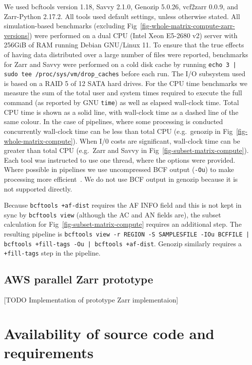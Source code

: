 \documentclass[a4paper,num-refs]{oup-contemporary}
\begin{document}
We used bcftools version 1.18, Savvy 2.1.0, Genozip 5.0.26,
vcf2zarr 0.0.9, and Zarr-Python 2.17.2. 
All tools used default settings, 
unless otherwise stated.
All simulation-based benchmarks (excluding Fig~\ref{fig-whole-matrix-compute-zarr-versions}) were performed on a 
dual CPU (Intel Xeon E5-2680 v2)
server with 256GiB of RAM running Debian GNU/Linux 11.
To ensure that the true effects of having data distributed over a large 
number of files were reported, benchmarks for Zarr and Savvy were 
performed on a cold disk cache by running 
\texttt{echo 3 | sudo tee /proc/sys/vm/drop\_caches} before each run.
The I/O subsystem used is based on a RAID 5 of 12 SATA hard drives.
For the CPU time benchmarks we measure the sum of the total user and
system times required to execute the full command (as reported by GNU
\texttt{time}) as well as elapsed wall-clock time. Total CPU
time is shown as a solid line, with wall-clock time as a dashed line 
of the same colour. In the case of pipelines, where some processing 
is conducted concurrently wall-clock time can be less than total
CPU (e.g.\ genozip in Fig~\ref{fig-whole-matrix-compute}). 
When I/0 costs are significant, wall-clock time can be greater 
than total CPU (e.g.\ Zarr and Savvy in Fig~\ref{fig-subset-matrix-compute}).
Each tool was instructed to use one thread, where the options
were provided. 
Where possible in pipelines we use uncompressed BCF
output (\texttt{-Ou}) to make processing 
more efficient~\citep{danecek2021twelve}.
We do not use BCF output in genozip because it is not supported
directly.

Because \texttt{bcftools +af-dist} requires the AF INFO field
and this is not kept in sync by \texttt{bcftools view}  
(although the AC and AN fields are), the subset calculation 
for Fig~\ref{fig-subset-matrix-compute} requires an additional step. 
The resulting pipeline is
\texttt{bcftools view -r REGION -S SAMPLESFILE -IOu BCFFILE | 
bcftools +fill-tags -Ou | bcftools +af-dist}. Genozip similarly
requires a \texttt{+fill-tags} step in the pipeline.

\subsection{AWS parallel Zarr prototype}
[TODO Implementation of prototype Zarr implementaion]

\section{Availability of source code and requirements}
\end{document}
